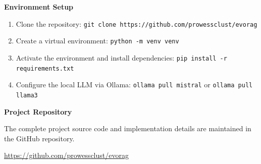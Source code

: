 \begin{appendices}
\textbf{Environment Setup}
\begin{enumerate}
    \item Clone the repository: \texttt{git clone https://github.com/prowessclust/evorag}
    \item Create a virtual environment: \texttt{python -m venv venv}
    \item Activate the environment and install dependencies: \texttt{pip install -r requirements.txt}
    \item Configure the local LLM via Ollama: \texttt{ollama pull mistral} or \texttt{ollama pull llama3}
\end{enumerate}

\textbf{Project Repository}

The complete project source code and implementation details are maintained in the GitHub repository.

\begin{center}
\url{https://github.com/prowessclust/evorag}
\end{center}

\end{appendices}